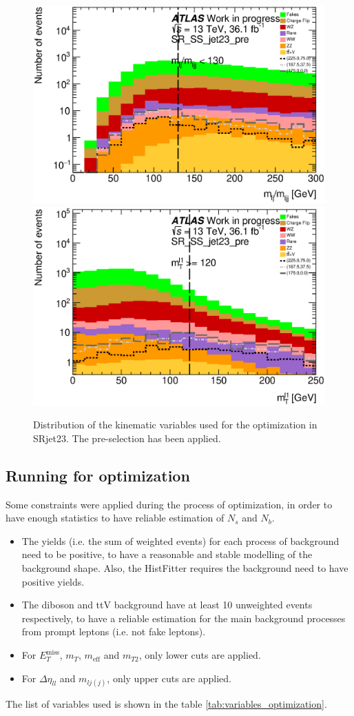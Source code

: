 \begin{figure}[htpb]
\includegraphics[width=0.45\linewidth]{data/plot/plot_SR/mlj_SR_SS_jet23_pre}
\includegraphics[width=0.45\linewidth]{data/plot/plot_SR/mt1_SR_SS_jet23_pre}\\
\caption{Distribution of the kinematic variables used for the optimization in SRjet23. The pre-selection has been applied.}
\label{fig:SRjet23_pre-selection}
\end{figure}

\subsection{Running for optimization}
Some constraints were applied during the process of optimization, in order to have enough statistics to have reliable estimation of $N_s$ and $N_b$.
\begin{itemize}
\item The yields (i.e. the sum of weighted events) for each process of background need to be positive, to have a reasonable and stable modelling of the background shape.
Also, the HistFitter requires the background need to have positive yields.
\item The diboson and ttV background have at least 10 unweighted events respectively, to have a reliable estimation for the main background processes from prompt leptons (i.e. not fake leptons).
\item For $E_T^{\text{miss}}$, $m_T$, $m_{\text{eff}}$ and $m_{T2}$, only lower cuts are applied.
\item For $\Delta \eta_{ll}$ and $m_{lj(j)}$, only upper cuts are applied.
\end{itemize}

The list of variables used is shown in the table \ref{tab:variables_optimization}.

